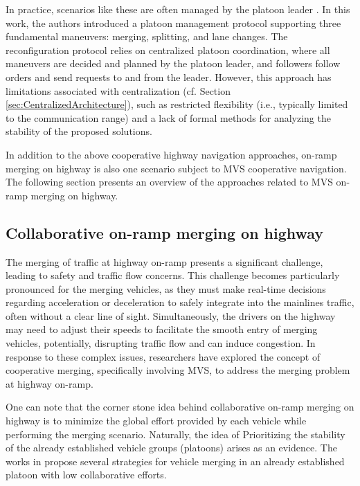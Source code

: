 In practice, scenarios like these are often managed by the platoon leader \cite{amoozadeh2015platoon}. In this work, the authors introduced a platoon management protocol supporting three fundamental maneuvers: merging, splitting, and lane changes. The reconfiguration protocol relies on centralized platoon coordination, where all maneuvers are decided and planned by the platoon leader, and followers follow orders and send requests to and from the leader. However, this approach has limitations associated with centralization (cf. Section \ref{sec:CentralizedArchitecture}), such as restricted flexibility (i.e., typically limited to the communication range) and a lack of formal methods for analyzing the stability of the proposed solutions. 


In addition to the above cooperative highway navigation approaches, on-ramp merging on highway is also one scenario subject to MVS cooperative navigation. The following section presents an overview of the approaches related to MVS on-ramp merging on highway.  
 
\subsection{Collaborative on-ramp merging on highway} \label{sec: cooperative_merging_on_highway}
The merging of traffic at highway on-ramp presents a significant challenge, leading to safety and traffic flow concerns. This challenge becomes particularly pronounced for the merging vehicles, as they must make real-time decisions regarding acceleration or deceleration to safely integrate into the mainlines traffic, often without a clear line of sight. Simultaneously, the drivers on the highway may need to adjust their speeds to facilitate the smooth entry of merging vehicles, potentially, disrupting traffic flow and can induce congestion. In response to these complex issues, researchers have explored the concept of cooperative merging, specifically involving MVS, to address the merging problem at highway on-ramp. 

One can note that the corner stone idea behind collaborative on-ramp merging on highway is to minimize the global effort provided by each vehicle while performing the merging scenario. Naturally, the idea of Prioritizing the stability of the already established vehicle groups (platoons) arises as an evidence. The works in \cite{SCHOLTE2022103511}\cite{s23094401}\cite{9781345} propose several strategies for vehicle merging in an already established platoon with low collaborative efforts.

